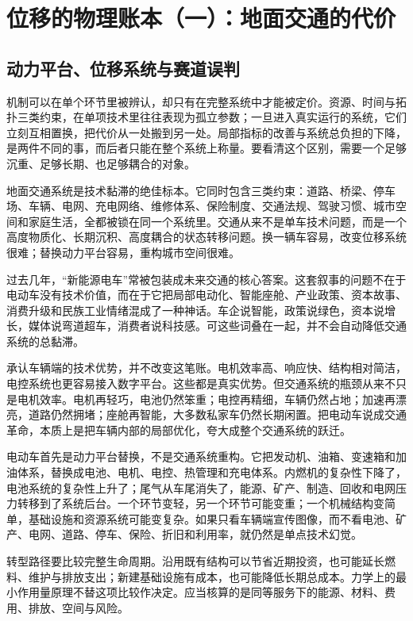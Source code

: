 \section{位移的物理账本（一）：地面交通的代价}

\subsection{动力平台、位移系统与赛道误判}

机制可以在单个环节里被辨认，却只有在完整系统中才能被定价。资源、时间与拓扑三类约束，在单项技术里往往表现为孤立参数；一旦进入真实运行的系统，它们立刻互相置换，把代价从一处搬到另一处。局部指标的改善与系统总负担的下降，是两件不同的事，而后者只能在整个系统上称量。要看清这个区别，需要一个足够沉重、足够长期、也足够耦合的对象。

地面交通系统是技术黏滞的绝佳标本。它同时包含三类约束：道路、桥梁、停车场、车辆、电网、充电网络、维修体系、保险制度、交通法规、驾驶习惯、城市空间和家庭生活，全都被锁在同一个系统里。交通从来不是单车技术问题，而是一个高度物质化、长期沉积、高度耦合的状态转移问题。换一辆车容易，改变位移系统很难；替换动力平台容易，重构城市空间很难。


过去几年，“新能源电车”常被包装成未来交通的核心答案。这套叙事的问题不在于电动车没有技术价值，而在于它把局部电动化、智能座舱、产业政策、资本故事、消费升级和民族工业情绪混成了一种神话。车企说智能，政策说绿色，资本说增长，媒体说弯道超车，消费者说科技感。可这些词叠在一起，并不会自动降低交通系统的总黏滞。

承认车辆端的技术优势，并不改变这笔账。电机效率高、响应快、结构相对简洁，电控系统也更容易接入数字平台。这些都是真实优势。但交通系统的瓶颈从来不只是电机效率。电机再轻巧，电池仍然笨重；电控再精细，车辆仍然占地；加速再漂亮，道路仍然拥堵；座舱再智能，大多数私家车仍然长期闲置。把电动车说成交通革命，本质上是把车辆内部的局部优化，夸大成整个交通系统的跃迁。

电动车首先是动力平台替换，不是交通系统重构。它把发动机、油箱、变速箱和加油体系，替换成电池、电机、电控、热管理和充电体系。内燃机的复杂性下降了，电池系统的复杂性上升了；尾气从车尾消失了，能源、矿产、制造、回收和电网压力转移到了系统后台。一个环节变轻，另一个环节可能变重；一个机械结构变简单，基础设施和资源系统可能变复杂。如果只看车辆端宣传图像，而不看电池、矿产、电网、道路、停车、保险、折旧和利用率，就仍然是单点技术幻觉。

转型路径要比较完整生命周期。沿用既有结构可以节省近期投资，也可能延长燃料、维护与排放支出；新建基础设施有成本，也可能降低长期总成本。力学上的最小作用量原理不替这项比较作决定。应当核算的是同等服务下的能源、材料、费用、排放、空间与风险。

